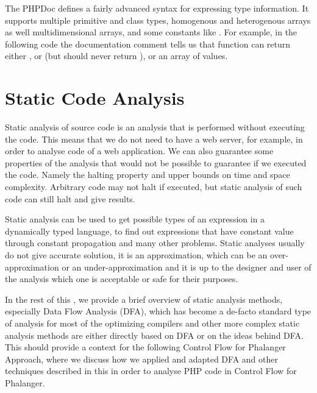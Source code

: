     The PHPDoc defines a fairly advanced syntax for expressing 
    type information. It supports multiple 
    primitive and class types, homogenous and heterogenous arrays as well 
    multidimensional arrays, and some constants like .
    For example, in the following code the documentation 
    comment tells us that function  can return 
    either , or  (but should never 
    return ), or an array of  values.
    
    
    \section{Static Code Analysis}       
    \label{statanal}
        Static analysis of source code is an analysis that is performed without 
        executing the code. This means that we do not need to have a
        web server, for example, in order to analyse code of a web application. 
        We can also guarantee some properties of the analysis that would not 
        be possible to guarantee if we executed the code. Namely the halting property and 
        upper bounds on time and space complexity. Arbitrary code may not 
        halt if executed, but static analysis of such code can still halt 
        and give results.
        
        Static analysis can be used to get possible types of an expression in 
        a dynamically typed language, to find out expressions that have constant 
        value through constant propagation and many other problems. 
        Static analyses usually do not give accurate solution, it is an approximation, 
        which can be an over-approximation or an under-approximation and it is up 
        to the designer and user of the analysis which one is acceptable or safe for 
        their purposes.
        
        In the rest of this \wsection{}, we provide a brief overview of 
        static analysis methods, especially 
        Data Flow Analysis (DFA)\cite{aho1985compilers}\cite{nielson1999principles},
        which has become a de-facto standard type of analysis for most of 
        the optimizing compilers and other more complex static analysis methods 
        are either directly based on DFA or on the ideas behind DFA.
        This should provide a context for the following \wsection{} 
        Control Flow for Phalanger Approach, where we discuss how we 
        applied and adapted DFA and other techniques described 
        in this \wsection{} in order to analyse PHP code in 
        Control Flow for Phalanger.
        
